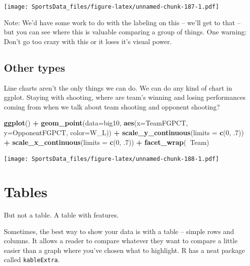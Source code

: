 \documentclass[]{book}
\newenvironment{Shaded}{\begin{snugshade}}{\end{snugshade}}
\newcommand{\DataTypeTok}[1]{\textcolor[rgb]{0.13,0.29,0.53}{#1}}
\newcommand{\DecValTok}[1]{\textcolor[rgb]{0.00,0.00,0.81}{#1}}
\newcommand{\FloatTok}[1]{\textcolor[rgb]{0.00,0.00,0.81}{#1}}
\newcommand{\KeywordTok}[1]{\textcolor[rgb]{0.13,0.29,0.53}{\textbf{#1}}}
\newcommand{\NormalTok}[1]{#1}
\newcommand{\OperatorTok}[1]{\textcolor[rgb]{0.81,0.36,0.00}{\textbf{#1}}}
\newcommand{\StringTok}[1]{\textcolor[rgb]{0.31,0.60,0.02}{#1}}
\begin{document}
\texttt{[image: SportsData\_files/figure-latex/unnamed-chunk-187-1.pdf]}

Note: We'd have some work to do with the labeling on this -- we'll get to that -- but you can see where this is valuable comparing a group of things. One warning: Don't go too crazy with this or it loses it's visual power.

\hypertarget{other-types}{%
\section{Other types}\label{other-types}}

Line charts aren't the only things we can do. We can do any kind of chart in ggplot. Staying with shooting, where are team's winning and losing performances coming from when we talk about team shooting and opponent shooting?

\begin{Shaded}
\begin{Highlighting}[]
\KeywordTok{ggplot}\NormalTok{() }\OperatorTok{+}\StringTok{ }\KeywordTok{geom_point}\NormalTok{(}\DataTypeTok{data=}\NormalTok{big10, }\KeywordTok{aes}\NormalTok{(}\DataTypeTok{x=}\NormalTok{TeamFGPCT, }\DataTypeTok{y=}\NormalTok{OpponentFGPCT, }\DataTypeTok{color=}\NormalTok{W_L)) }\OperatorTok{+}\StringTok{ }\KeywordTok{scale_y_continuous}\NormalTok{(}\DataTypeTok{limits =} \KeywordTok{c}\NormalTok{(}\DecValTok{0}\NormalTok{, }\FloatTok{.7}\NormalTok{)) }\OperatorTok{+}\StringTok{ }\KeywordTok{scale_x_continuous}\NormalTok{(}\DataTypeTok{limits =} \KeywordTok{c}\NormalTok{(}\DecValTok{0}\NormalTok{, }\FloatTok{.7}\NormalTok{)) }\OperatorTok{+}\StringTok{ }\KeywordTok{facet_wrap}\NormalTok{(}\OperatorTok{~}\NormalTok{Team)}
\end{Highlighting}
\end{Shaded}

\texttt{[image: SportsData\_files/figure-latex/unnamed-chunk-188-1.pdf]}

\hypertarget{tables}{%
\chapter{Tables}\label{tables}}

But not a table. A table with features.

Sometimes, the best way to show your data is with a table -- simple rows and columns. It allows a reader to compare whatever they want to compare a little easier than a graph where you've chosen what to highlight. R has a neat package called \texttt{kableExtra}.
\end{document}
